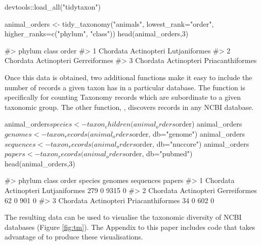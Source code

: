\begin{example}
devtools::load_all("tidytaxon")

animal_orders <- tidy_taxonomy("animals", 
                               lowest_rank="order",
                               higher_ranks=c("phylum", "class"))
head(animal_orders,3)

#>     phylum       class            order
#> 1 Chordata Actinopteri    Lutjaniformes
#> 2 Chordata Actinopteri     Gerreiformes
#> 3 Chordata Actinopteri Priacanthiformes
\end{example}

Once this data is obtained, two additional functions make it easy to include the
number of records a given taxon has in a particular database. The function
 is specifically for counting Taxonomy records which are
subordinate to a given taxonomic group. The other function,  , 
discovers records in any NCBI database.

\begin{example}
animal_orders$species <- taxon_children(animal_orders$order)
animal_orders$genomes <- taxon_records(animal_orders$order, db="genome")
animal_orders$sequences <- taxon_records(animal_orders$order, db="nuccore")
animal_orders$papers <- taxon_records(animal_orders$order, db="pubmed")
head(animal_orders,3)

#>     phylum       class            order species genomes sequences papers
#> 1 Chordata Actinopteri    Lutjaniformes     279       0      9315      0
#> 2 Chordata Actinopteri     Gerreiformes      62       0       901      0
#> 3 Chordata Actinopteri Priacanthiformes      34       0       602      0
\end{example}

The resulting data can be used to visualise the taxonomic diversity of NCBI 
databases (Figure \ref{fig:tm}). The Appendix to this paper 
includes code that takes advantage of  \citep{treemap} to 
produce these visualisations. 

